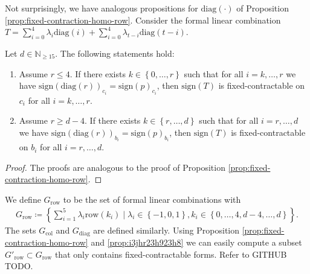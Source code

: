 Not surprisingly, we have analogous propositions for \( \mathrm{diag}(\cdot) \) of Proposition \ref{prop:fixed-contraction-homo-row}. Consider the formal linear combination \(  T = \sum_{i=0}^{4}  \lambda_{i} \mathrm{diag}(i) + \sum_{i=0}^{4}  \lambda_{t-i} \mathrm{diag}(t-i) \).

\begin{proposition}\label{prop:fixed-contraction-homo-diag}
    Let \( d \in \mathbb{N}_{\geq 15} \). The following statements hold:
    \begin{enumerate}
        \item  Assume \( r \leq 4 \). If there exists \( k \in \left\{ 0, \dots, r \right\} \) such that for all \( i = k, \dots, r\) we have \(  \mathrm{sign}(\mathrm{diag}(r))_{c_i} = \mathrm{sign}(p)_{c_i} \),
        then  \( \mathrm{sign}(T) \) is fixed-contractable on \( c_i \) for all \( i = k, \dots, r \).
        \item Assume \( r \geq d-4 \).
        If there exists \( k \in \left\{ r, \dots, d \right\} \) such that for all \( i = r, \dots, d\) we have \(  \mathrm{sign}(\mathrm{diag}(r))_{b_i} = \mathrm{sign}(p)_{b_i} \),
        then  \( \mathrm{sign}(T) \) is fixed-contractable on \( b_i \) for all \( i = r, \dots, d \).
    \end{enumerate}
\end{proposition}

\begin{proof}
    The proofs are analogous to the proof of Proposition \ref{prop:fixed-contraction-homo-row}.
\end{proof}


We define \( G_{\mathrm{row}} \) to be the set of formal linear combinations with 
\begin{align*}
    G_{\mathrm{row}} \coloneqq \left\{ 
    \sum_{i=1}^5 \lambda_i \mathrm{row}(k_i) \mid \lambda_i \in \left\{-1, 0,1 \right\},  k_i \in \left\{ 0,\dots,4,d-4, \dots, d \right\}
     \right\}.
\end{align*}
The sets \( G_{\mathrm{col}} \) and \( G_{\mathrm{diag}} \) are defined similarly. Using Proposition \ref{prop:fixed-contraction-homo-row} and \ref{prop:i3jhr23h923h8} we can easily compute a subset \( G'_{\mathrm{row}} \subset G_{\mathrm{row}} \) that only contains fixed-contractable forms. Refer to GITHUB TODO.


